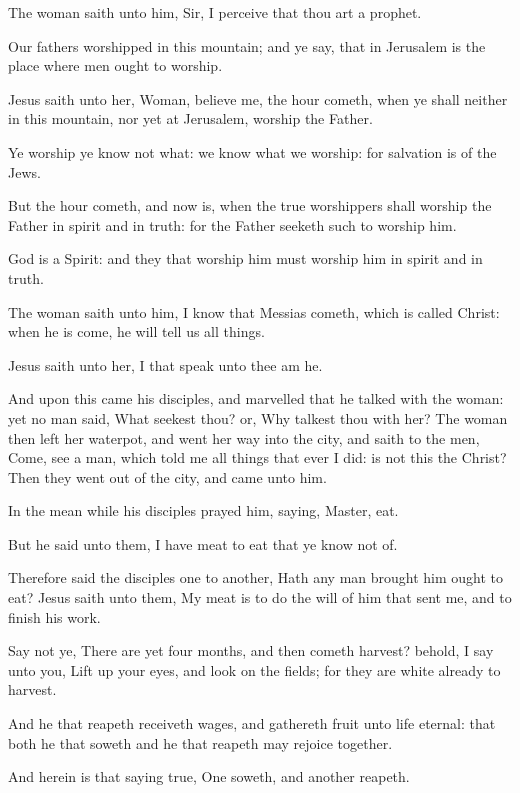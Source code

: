 \Verse The woman saith unto him, Sir, I perceive that thou art a prophet.

\Verse Our fathers worshipped in this mountain; and ye say, that in Jerusalem is the place where men ought to worship.

\Verse Jesus saith unto her, Woman, believe me, the hour cometh, when ye shall neither in this mountain, nor yet at Jerusalem, worship the Father.

\Verse Ye worship ye know not what: we know what we worship: for salvation is of the Jews.

\Verse But the hour cometh, and now is, when the true worshippers shall worship the Father in spirit and in truth: for the Father seeketh such to worship him.

\Verse God is a Spirit: and they that worship him must worship him in spirit and in truth.

\Verse The woman saith unto him, I know that Messias cometh, which is called Christ: when he is come, he will tell us all things.

\Verse Jesus saith unto her, I that speak unto thee am he.

\Verse And upon this came his disciples, and marvelled that he talked with the woman: yet no man said, What seekest thou? or, Why talkest thou with her?  \Verse The woman then left her waterpot, and went her way into the city, and saith to the men, \Verse Come, see a man, which told me all things that ever I did: is not this the Christ?  \Verse Then they went out of the city, and came unto him.

\Verse In the mean while his disciples prayed him, saying, Master, eat.

\Verse But he said unto them, I have meat to eat that ye know not of.

\Verse Therefore said the disciples one to another, Hath any man brought him ought to eat?  \Verse Jesus saith unto them, My meat is to do the will of him that sent me, and to finish his work.

\Verse Say not ye, There are yet four months, and then cometh harvest?  behold, I say unto you, Lift up your eyes, and look on the fields; for they are white already to harvest.

\Verse And he that reapeth receiveth wages, and gathereth fruit unto life eternal: that both he that soweth and he that reapeth may rejoice together.

\Verse And herein is that saying true, One soweth, and another reapeth.

